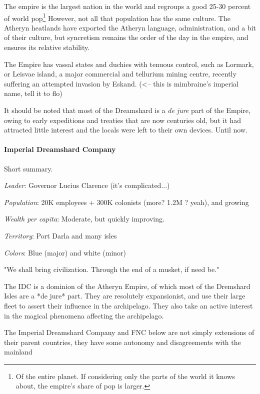 The empire is the largest nation in the world and regroups a good 25-30 percent of world pop\footnote{Of the entire planet. If considering only the parts of the world it knows about, the empire's share of pop is larger.} However, not all that population has the same culture. The Atheryn heatlands have exported the Atheryn language, administration, and a bit of their culture, but syncretism remains the order of the day in the empire, and ensures its relative stability. 

The Empire has vassal states and duchies with tenuous control, such as Lormark, or Leisvae island, a major commercial and tellurium mining centre, recently suffering an attempted invasion by Eskand. (<-- this is mimbraine's imperial name, tell it to flo)

It should be noted that most of the Dreamshard is a \textit{de jure} part of the Empire, owing to early expeditions and treaties that are now centuries old, but it had attracted little interest and the locals were left to their own devices. Until now.



\paragraph{Imperial Dreamshard Company}

Short summary.

\textit{Leader}: Governor Lucius Clarence (it's complicated...)

\textit{Population}: 20K employees + 300K colonists (more? 1.2M ? yeah), and growing

\textit{Wealth per capita}: Moderate, but quickly improving.

\textit{Territory}: Port Darla and many isles

\textit{Colors}: Blue (major) and white (minor)


\begin{rpg-quotebox}
    "We shall bring civilization. Through the end of a musket, if need be."
    \end{rpg-quotebox}
    



The IDC is a dominion of the Atheryn Empire, of which most of the Dremshard Isles are a *de jure* part. They are resolutely expansionist, and use their large fleet to assert their influence in the archipelago. They also take an active interest in the magical phenomena affecting the archipelago.


The Imperial Dreamshard Company and FNC below are not simply extensions of their parent countries, they have some autonomy and disagreements with the mainland



